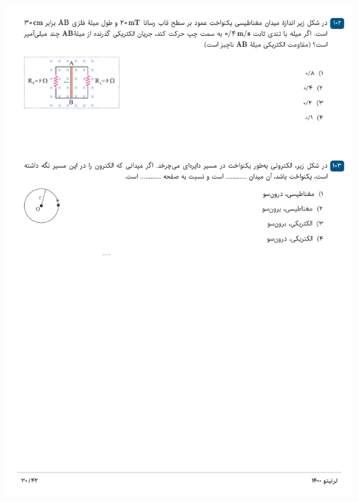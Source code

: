 \documentclass{book}
\begin{document}
\includegraphics[width=\textwidth]{"pages/30"}
\end{document}
